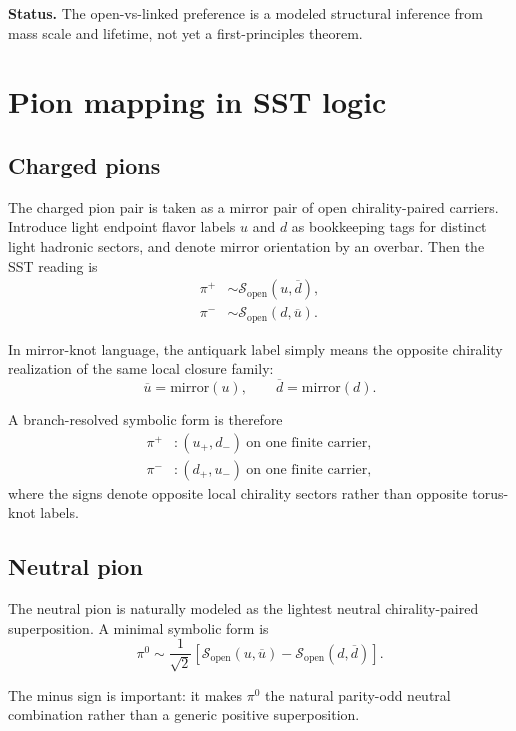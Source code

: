 \documentclass[11pt,a4paper]{article}
\newcommand{\piplus}{\pi^{+}}
\newcommand{\piminus}{\pi^{-}}
\newcommand{\pizero}{\pi^{0}}
\newcommand{\Status}[1]{\par\smallskip\noindent\textbf{Status.} #1\par\smallskip}
\begin{document}
\Status{The open-vs-linked preference is a modeled structural inference from mass scale and lifetime, not yet a first-principles theorem.}

\section{Pion mapping in SST logic}
\subsection{Charged pions}
The charged pion pair is taken as a mirror pair of open chirality-paired carriers. Introduce light endpoint flavor labels \(u\) and \(d\) as bookkeeping tags for distinct light hadronic sectors, and denote mirror orientation by an overbar. Then the SST reading is
\begin{align}
\piplus &\sim \mathcal{S}_{\text{open}}(u,\overline d),\\
\piminus &\sim \mathcal{S}_{\text{open}}(d,\overline u).
\end{align}

In mirror-knot language, the antiquark label simply means the opposite chirality realization of the same local closure family:
\begin{equation}
\overline u = \text{mirror}(u),
\qquad
\overline d = \text{mirror}(d).
\end{equation}

A branch-resolved symbolic form is therefore
\begin{align}
\piplus &: (u_{+}, d_{-})\ \text{on one finite carrier},\\
\piminus &: (d_{+}, u_{-})\ \text{on one finite carrier},
\end{align}
where the signs denote opposite local chirality sectors rather than opposite torus-knot labels.

\subsection{Neutral pion}
The neutral pion is naturally modeled as the lightest neutral chirality-paired superposition. A minimal symbolic form is
\begin{equation}
\pizero
\sim
\frac{1}{\sqrt{2}}
\left[
\mathcal{S}_{\text{open}}(u,\overline u)
-
\mathcal{S}_{\text{open}}(d,\overline d)
\right].
\label{eq:pizero}
\end{equation}

The minus sign is important: it makes \(\pizero\) the natural parity-odd neutral combination rather than a generic positive superposition.
\end{document}
